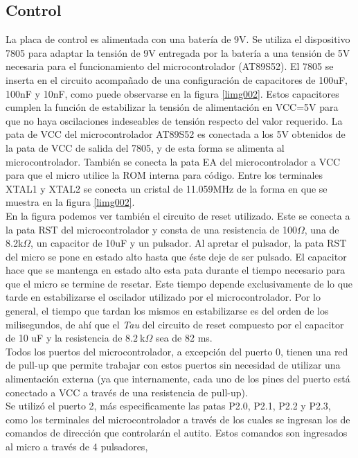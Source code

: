 \documentclass[a4paper,10pt]{article}
\begin{document}
		\subsection{Control}
			La placa de control es alimentada con una batería de 9V. Se utiliza el
			dispositivo 7805 para adaptar la tensión de 9V entregada por la batería
			a una tensión de 5V necesaria para el funcionamiento del microcontrolador (AT89S52).
			El 7805 se inserta en el circuito acompañado de una configuración de capacitores de
			100uF, 100nF y 10nF, como puede observarse en la figura \ref{limg002}. Estos capacitores cumplen la función de estabilizar la tensión de 
			alimentación en VCC=5V para que no haya oscilaciones indeseables de tensión respecto del valor requerido.
			La pata de VCC del microcontrolador AT89S52 es conectada a los 5V obtenidos de la pata de VCC de salida del 7805, y de esta forma se alimenta al 
			microcontrolador. También se conecta la pata EA del microcontrolador a VCC para que el micro utilice la ROM interna para código. Entre los terminales 
			XTAL1 y XTAL2 se conecta un cristal de 11.059MHz de la forma en que se muestra en la figura \ref{limg002}. \\
			\indent En la figura podemos ver también el circuito de reset utilizado. Este se conecta a la pata RST del microcontrolador y consta de una 
			resistencia de 100$\Omega$, una de 8.2k$\Omega$, un capacitor de 10uF y un pulsador. Al apretar el pulsador, la pata RST del micro se pone en estado 
			alto hasta que éste deje de ser pulsado. El capacitor hace que se mantenga en estado alto esta pata durante el tiempo necesario para que el micro se 
			termine de resetar. Este tiempo depende exclusivamente de lo que tarde en estabilizarse el oscilador utilizado por el microcontrolador. Por lo general,
			el tiempo que tardan los mismos en estabilizarse es del orden de los milisegundos, de ahí que el \emph{Tau} del circuito de reset compuesto por el 
			capacitor de 10 uF y la resistencia de $8.2~\text{k}\Omega$ sea de 82 ms. \\   
			\indent Todos los puertos del microcontrolador, a excepción del puerto 0, tienen una red de pull-up que permite trabajar con estos puertos 
			sin necesidad de utilizar una alimentación externa (ya que internamente, cada uno de los pines del puerto está conectado a VCC a través de una 
			resistencia de pull-up).\\
			\indent Se utilizó el puerto 2, más especificamente las patas P2.0, P2.1, P2.2 y P2.3, como los terminales del microcontrolador a través de 
			los cuales se ingresan los de comandos de dirección que controlarán el autito. Estos comandos son ingresados al micro a través de 4 pulsadores, 
\end{document}
